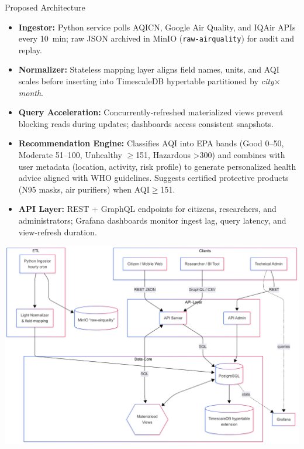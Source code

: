 \documentclass[a0paper,portrait]{baposter}
\newcommand{\alert}[1]{{\color{udblue}#1}}
\begin{document}
\begin{poster}
\begin{posterbox}[name=solution,column=0,below=goal]{Proposed Architecture}
\begin{itemize}
  \item \textbf{Ingestor:} Python service polls AQICN, Google Air Quality, and IQAir APIs every 10~min; raw JSON archived in \alert{MinIO} (\texttt{raw-airquality}) for audit and replay.
  \item \textbf{Normalizer:} Stateless mapping layer aligns field names, units, and AQI scales before inserting into \alert{TimescaleDB} hypertable partitioned by \textit{city}$\times$\textit{month}.
  \item \textbf{Query Acceleration:} Concurrently‑refreshed materialized views prevent blocking reads during updates; dashboards access consistent snapshots.
  \item \textbf{Recommendation Engine:} Classifies AQI into EPA bands (Good 0--50, Moderate 51--100, Unhealthy $\geq$151, Hazardous >300) and combines with user metadata (location, activity, risk profile) to generate personalized health advice aligned with WHO guidelines. Suggests certified protective products (N95 masks, air purifiers) when AQI$\geq$151.
  \item \textbf{API Layer:} REST + GraphQL endpoints for citizens, researchers, and administrators; \alert{Grafana} dashboards monitor ingest lag, query latency, and view-refresh duration.
\end{itemize}
  \centering
  \includegraphics[width=0.95\linewidth]{images/fig1_architecture.png}
\end{posterbox}


\end{poster}
\end{document}
